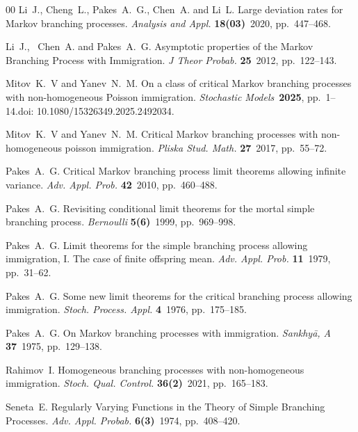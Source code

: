 \documentclass[10pt,reqno]{amsart}
\theoremstyle{definition}
\numberwithin{equation}{section}
\begin{document}
\begin{thebibliography}{00}
    {\sc Li~J., Cheng~L., Pakes~A.~G., Chen~A. and Li~L.}
    {Large deviation rates for Markov branching processes.}
    \textit{Analysis and Appl.} \textbf{18(03)}~2020, pp.~447--468.

    {\sc Li~J., ~Chen~A. and Pakes~A.~G.}
    {Asymptotic properties of the Markov Branching Process with Immigration.}
    \textit{J Theor Probab.} \textbf{25}~2012,  pp.~122--143.

    {\sc Mitov~K.~V and Yanev~N.~M.}
    {On a class of critical Markov branching processes with non-homogeneous Poisson immigration.}
    \textit{Stochastic Models}~\textbf{2025}, pp.~1--14.doi: 10.1080/15326349.2025.2492034.

    {\sc Mitov~K.~V and Yanev~N.~M.}
    {Critical Markov branching processes with non-homogeneous poisson immigration.}
    \textit{Pliska Stud. Math.} \textbf{27}~2017, pp.~55--72.

    {\sc Pakes~A.~G.}
    {Critical Markov branching process limit theorems allowing infinite variance.}
    \textit{Adv. Appl. Prob.} \textbf{42}~2010, pp.~460--488.

    {\sc Pakes~A.~G.}
    {Revisiting conditional limit theorems for the mortal simple branching process.}
    \textit{Bernoulli} \textbf{5(6)}~1999, pp.~969--998.

    {\sc Pakes~A.~G.}
    {Limit theorems for the simple branching process allowing immigration, I. The case of finite offspring mean.}
    \textit{Adv. Appl. Prob.} \textbf{11}~1979, pp.~31--62.

    {\sc Pakes~A.~G.}
    {Some new limit theorems for the critical branching process allowing immigration.}
    \textit{Stoch. Process. Appl.} \textbf{4}~1976, pp.~175--185.

    {\sc Pakes~A.~G.}
    {On Markov branching processes with immigration.}
    \textit{Sankhy\={a}, A} \textbf{37}~1975, pp.~129--138.

    {\sc Rahimov~I.}
    {Homogeneous branching processes with non-homogeneous immigration.}
    \textit{Stoch. Qual. Control.} \textbf{36(2)}~2021, pp.~165--183.

    {\sc Seneta~E.}
    {Regularly Varying Functions in the Theory of Simple Branching Processes.}
    \textit{Adv. Appl. Probab.} \textbf{6(3)}~1974, pp.~408--420.


\end{thebibliography}
\end{document}
